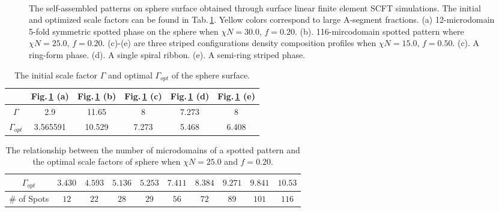 \documentclass[final,1p,times]{elsarticle}
\begin{document}
\begin{figure}[H]
\setlength{\captionmargin}{2pt}
\centering
    \hspace{0.5cm}
\\
    \hspace{0.5cm}
    \hspace{0.5cm}
\caption{\label{fig:sphere}
The self-assembled patterns on sphere surface obtained through surface linear finite element SCFT simulations.
The initial and optimized scale factors can be found in
Tab.\,\ref{tab:sphere:radius}.
Yellow colors correspond to large A-segment fractions.
(a) 12-microdomain 5-fold symmetric spotted phase on
the sphere when $\chi N=30.0$, $f=0.20$. 
(b). 116-mircodomain spotted pattern where $\chi N=25.0$, $f=0.20$.
(c)-(e) are three striped configurations density
composition profiles when $\chi N=15.0$, $f=0.50$.
(c). A ring-form phase.
(d). A single spiral ribbon.
(e). A semi-ring striped phase.
}
\end{figure}

\begin{table}[H]
	\caption{The initial scale factor $\Gamma$ and optimal $\Gamma_{opt}$ of
    the sphere surface.}
  \label{tab:sphere:radius}
  \centering
\begin{tabular}{|c|c|c|c|c|c|}
 \hline
 & Fig.\,\ref{fig:sphere} (a) & Fig.\,\ref{fig:sphere} (b) & Fig.\,\ref{fig:sphere} (c) & Fig.\,\ref{fig:sphere} (d) & Fig.\,\ref{fig:sphere} (e)
 \\ \hline
$\Gamma$ & 2.9 & 11.65 & 8 & 7.273 & 8
 \\ \hline
 $\Gamma_{opt}$ & 3.565591 & 10.529 & 7.273 & 5.468 & 6.408 
 \\ \hline
\end{tabular}
\end{table}

\begin{table}[H]
\caption{The relationship between the number of microdomains of a
spotted pattern and the optimal scale factors of sphere when $\chi N=25.0$ and
$f=0.20$. }
  \label{tab:sphere:spotNum}
  \centering
\begin{tabular}{|c|c|c|c|c|c|c|c|c|c|}
 \hline
 $\Gamma_{opt}$ & $3.430$ & $4.593$ & $5.136$ & $5.253$ & $7.411$ & $8.384$ & $9.271$ & $9.841$ & $10.53$
 \\ \hline
 \# of Spots & $12$ & $22$ & $28$ & $29$ & $56$ & $72$ & $89$ & $101$ & $116$
 \\ \hline
\end{tabular}
\end{table}
\end{document}
